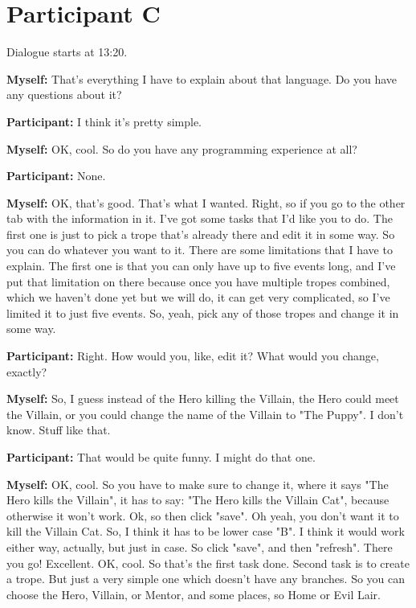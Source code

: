 \documentclass[11pt]{report}
\begin{document}
\section{Participant C}

Dialogue starts at 13:20.

\begin{linenumbers}
\textbf{Myself:} That's everything I have to explain about that language. Do you have any questions about it?

\textbf{Participant:} I think it's pretty simple.

\textbf{Myself:} OK, cool. So do you have any programming experience at all?

\textbf{Participant:} None.

\textbf{Myself:} OK, that's good. That's what I wanted. Right, so if you go to the other tab with the information in it. I've got some tasks that I'd like you to do. The first one is just to pick a trope that's already there and edit it in some way. So you can do whatever you want to it. There are some limitations that I have to explain. The first one is that you can only have up to five events long, and I've put that limitation on there because once you have multiple tropes combined, which we haven't done yet but we will do, it can get very complicated, so I've limited it to just five events. So, yeah, pick any of those tropes and change it in some way.

\textbf{Participant:} Right. How would you, like, edit it? What would you change, exactly?

\textbf{Myself:} So, I guess instead of the Hero killing the Villain, the Hero could meet the Villain, or you could change the name of the Villain to "The Puppy". I don't know. Stuff like that.

\textbf{Participant:} That would be quite funny. I might do that one.

\textbf{Myself:} OK, cool. So you have to make sure to change it, where it says "The Hero kills the Villain", it has to say: "The Hero kills the Villain Cat", because otherwise it won't work. Ok, so then click "save". Oh yeah, you don't want it to kill the Villain Cat. So, I think it has to be lower case "B". I think it would work either way, actually, but just in case. So click "save", and then "refresh". There you go! Excellent. OK, cool. So that's the first task done. Second task is to create a trope. But just a very simple one which doesn't have any branches. So you can choose the Hero, Villain, or Mentor, and some places, so Home or Evil Lair.


\end{linenumbers}
\end{document}
